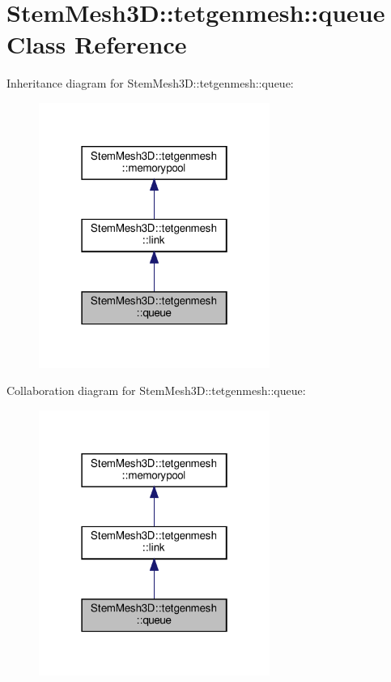 \hypertarget{classStemMesh3D_1_1tetgenmesh_1_1queue}{}\section{Stem\+Mesh3D\+:\+:tetgenmesh\+:\+:queue Class Reference}
\label{classStemMesh3D_1_1tetgenmesh_1_1queue}


Inheritance diagram for Stem\+Mesh3D\+:\+:tetgenmesh\+:\+:queue\+:\nopagebreak
\begin{figure}[H]
\begin{center}
\leavevmode
\includegraphics[width=214pt]{classStemMesh3D_1_1tetgenmesh_1_1queue__inherit__graph}
\end{center}
\end{figure}


Collaboration diagram for Stem\+Mesh3D\+:\+:tetgenmesh\+:\+:queue\+:\nopagebreak
\begin{figure}[H]
\begin{center}
\leavevmode
\includegraphics[width=214pt]{classStemMesh3D_1_1tetgenmesh_1_1queue__coll__graph}
\end{center}
\end{figure}
